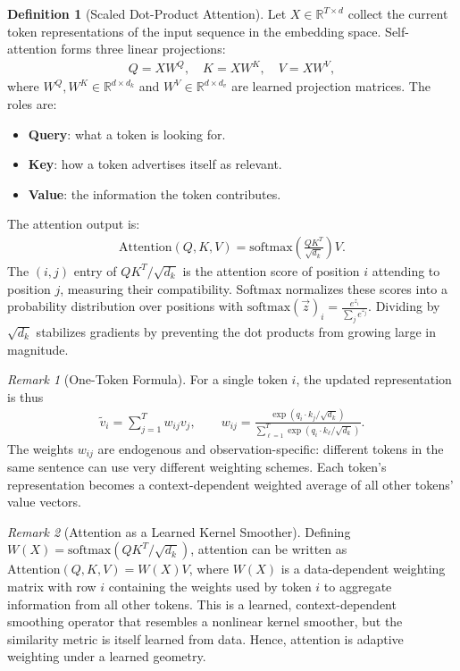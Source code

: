 \documentclass[11pt]{article}
\theoremstyle{definition}
\newtheorem{definition}{Definition}[section]
\theoremstyle{plain}
\theoremstyle{remark}
\newtheorem{remark}{Remark}[section]
\begin{document}
\begin{definition}[Scaled Dot-Product Attention]
    Let $X \in \mathbb{R}^{T \times d}$ collect the current token representations of the input sequence in the embedding space. Self-attention forms three linear projections:
    \begin{align}
        Q = XW^Q, \quad K = XW^K, \quad V = XW^V,
    \end{align}
    where $W^Q, W^K \in \mathbb{R}^{d \times d_k}$ and $W^V \in \mathbb{R}^{d \times d_v}$ are learned projection matrices. The roles are:
    \begin{itemize}[noitemsep]
        \item \textbf{Query}: what a token is looking for.
        \item \textbf{Key}: how a token advertises itself as relevant.
        \item \textbf{Value}: the information the token contributes.
    \end{itemize}
    The attention output is:
    \begin{align}
        \text{Attention}(Q, K, V) = \text{softmax}\!\left(\frac{QK^T}{\sqrt{d_k}}\right)V.
    \end{align}
    The $(i,j)$ entry of $QK^T / \sqrt{d_k}$ is the attention score of position $i$ attending to position $j$, measuring their compatibility. Softmax normalizes these scores into a probability distribution over positions with $\text{softmax}(\vec{z})_i = \frac{e^{z_i}}{\sum_je^{z_j}}$. Dividing by $\sqrt{d_k}$ stabilizes gradients by preventing the dot products from growing large in magnitude.
\end{definition}

\begin{remark}[One-Token Formula]
    For a single token $i$, the updated representation is thus
    \begin{align}
        \tilde{v}_i = \sum_{j=1}^T w_{ij} v_j, \qquad w_{ij} = \frac{\exp(q_i\cdot k_j / \sqrt{d_k})}{\sum_{\ell=1}^T \exp(q_i\cdot k_\ell / \sqrt{d_k})}.
    \end{align}
    The weights $w_{ij}$ are endogenous and observation-specific: different tokens in the same sentence can use very different weighting schemes. Each token's representation becomes a context-dependent weighted average of all other tokens' value vectors.
\end{remark}

\begin{remark}[Attention as a Learned Kernel Smoother]
    Defining $W(X) = \text{softmax}(QK^T/\sqrt{d_k})$, attention can be written as $\text{Attention}(Q,K,V) = W(X)V$, where $W(X)$ is a data-dependent weighting matrix with row $i$ containing the weights used by token $i$ to aggregate information from all other tokens. This is a learned, context-dependent smoothing operator that resembles a nonlinear kernel smoother, but the similarity metric is itself learned from data. Hence, attention is adaptive weighting under a learned geometry.
\end{remark}
\end{document}
